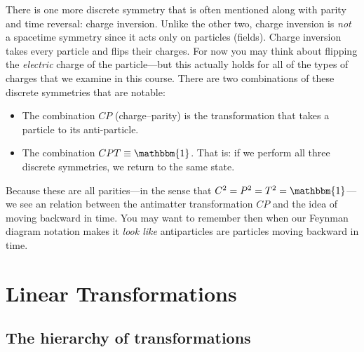 \documentclass[12pt, oneside]{report}    %
\let\oldsection\section
\def\section{%
  \setcounter{sidenote}{1}%
  \oldsection
}
\begin{document}
\begin{subappendices}
There is one more discrete symmetry that is often mentioned along with parity and time reversal: charge inversion. Unlike the other two, charge inversion is \emph{not} a spacetime symmetry since it acts only on particles (fields). Charge inversion takes every particle and flips their charges. For now you may think about flipping the \emph{electric} charge of the particle---but this actually holds for all of the types of charges that we examine in this course. There are two combinations of these discrete symmetries that are notable:
\begin{itemize}
    \item The combination $CP$ (charge--parity) is the transformation that takes a particle to its anti-particle.
    \item The combination $CPT \equiv \mathbbm{1}$. That is: if we perform all three discrete symmetries, we return to the same state.
\end{itemize}
Because these are all parities---in the sense that $C^2 = P^2 = T^2 = \mathbbm{1}$---we see an relation between the antimatter transformation $CP$ and the idea of moving backward in time. You may want to remember then when our Feynman diagram notation makes it \emph{look like} antiparticles are particles moving backward in time.

\end{subappendices}








\chapter{Linear Transformations}

\section{The hierarchy of transformations}
\end{document}
